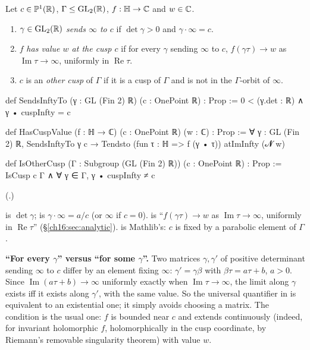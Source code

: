 \begin{definition}\label{ch16:def:cuspdata}
Let $c\in\mathbb{P}^1(\mathbb{R})$, $\Gamma\le\mathrm{GL}_2(\mathbb{R})$, $f:\mathbb{H}\to{\mathbb{C}}$ and $w\in{\mathbb{C}}$.
\begin{enumerate}[label=(\alph*)]
\item $\gamma\in\mathrm{GL}_2(\mathbb{R})$ \emph{sends $\infty$ to $c$} if $\det\gamma>0$ and $\gamma\cdot\infty=c$.
\item $f$ \emph{has value $w$ at the cusp $c$} if for every $\gamma$ sending $\infty$ to $c$,
  $f(\gamma\tau)\to w$ as $\operatorname{Im}\tau\to\infty$, uniformly in $\operatorname{Re}\tau$.
\item $c$ is an \emph{other cusp} of $\Gamma$ if it is a cusp of $\Gamma$ and is not in the $\Gamma$-orbit of $\infty$.
\end{enumerate}
\end{definition}
\begin{leancode}
def SendsInftyTo (γ : GL (Fin 2) ℝ) (c : OnePoint ℝ) : Prop :=
  0 < (γ.det : ℝ) ∧ γ • cuspInfty = c

def HasCuspValue (f : ℍ → ℂ) (c : OnePoint ℝ) (w : ℂ) : Prop :=
  ∀ γ : GL (Fin 2) ℝ, SendsInftyTo γ c → Tendsto (fun τ : ℍ => f (γ • τ)) atImInfty (𝓝 w)

def IsOtherCusp (Γ : Subgroup (GL (Fin 2) ℝ)) (c : OnePoint ℝ) : Prop :=
  IsCusp c Γ ∧ ∀ γ ∈ Γ, γ • cuspInfty ≠ c
\end{leancode}
(.)
\begin{dictionary}
 is $\det\gamma$;  is $\gamma\cdot\infty=a/c$ (or $\infty$ if $c=0$).
 is ``$f(\gamma\tau)\to w$ as $\operatorname{Im}\tau\to\infty$,
uniformly in $\operatorname{Re}\tau$'' (\S\ref{ch16:sec:analytic}).   is Mathlib's: $c$ is fixed by a
parabolic element of $\Gamma$.

\textbf{``For every $\gamma$'' versus ``for some $\gamma$''.}  Two matrices $\gamma,\gamma'$ of positive determinant
sending $\infty$ to $c$ differ by an element fixing $\infty$: $\gamma'=\gamma\beta$ with
$\beta\tau=a\tau+b$, $a>0$.  Since $\operatorname{Im}(a\tau+b)\to\infty$ uniformly exactly when
$\operatorname{Im}\tau\to\infty$, the limit along $\gamma$ exists iff it exists along $\gamma'$, with the same value.
So the universal quantifier in  is equivalent to an existential one; it simply avoids choosing a
matrix.  The condition is the usual one: $f$ is bounded near $c$ and extends continuously (indeed, for invariant
holomorphic $f$, holomorphically in the cusp coordinate, by Riemann's removable singularity theorem) with value $w$.
\end{dictionary}
